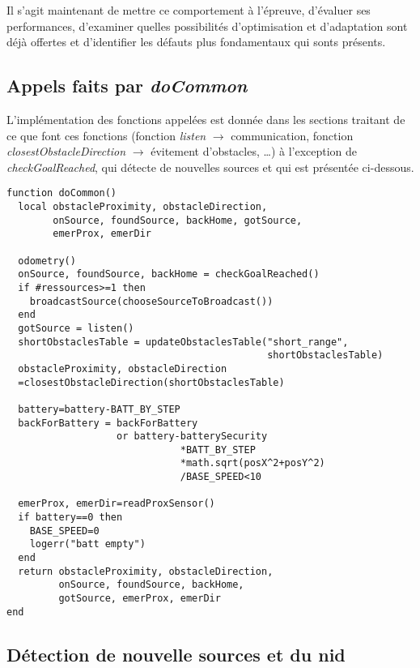 Il s'agit maintenant de mettre ce comportement à l'épreuve, d'évaluer ses performances, d'examiner quelles possibilités d'optimisation et d'adaptation sont déjà offertes et d'identifier les défauts plus fondamentaux qui sonts présents.

\begin{subappendices}
  \subsection{Appels faits par \emph{doCommon}}

  L'implémentation des fonctions appelées est donnée dans les sections traitant de ce que font ces fonctions (fonction \emph{listen} $\rightarrow$ communication, fonction \emph{closestObstacleDirection} $\rightarrow$ évitement d'obstacles, \ldots) à l'exception de \emph{checkGoalReached}, qui détecte de nouvelles sources et qui est présentée ci-dessous.
\begin{lstlisting}[caption=fonction doCommon]
function doCommon()
  local obstacleProximity, obstacleDirection,
        onSource, foundSource, backHome, gotSource,
        emerProx, emerDir

  odometry()
  onSource, foundSource, backHome = checkGoalReached()
  if #ressources>=1 then
    broadcastSource(chooseSourceToBroadcast())
  end
  gotSource = listen()
  shortObstaclesTable = updateObstaclesTable("short_range",
                                             shortObstaclesTable)
  obstacleProximity, obstacleDirection
  =closestObstacleDirection(shortObstaclesTable)

  battery=battery-BATT_BY_STEP
  backForBattery = backForBattery
                   or battery-batterySecurity
                              *BATT_BY_STEP
                              *math.sqrt(posX^2+posY^2)
                              /BASE_SPEED<10

  emerProx, emerDir=readProxSensor()
  if battery==0 then
    BASE_SPEED=0
    logerr("batt empty")
  end
  return obstacleProximity, obstacleDirection,
         onSource, foundSource, backHome,
         gotSource, emerProx, emerDir
end
\end{lstlisting}

\subsection{Détection de nouvelle sources et du nid}


\end{subappendices}
